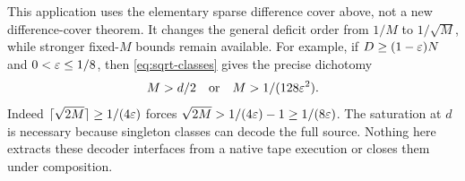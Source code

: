 This application uses the elementary sparse difference cover above, not a
new difference-cover theorem. It changes the general deficit order from
$1/M$ to $1/\sqrt M$, while stronger fixed-$M$ bounds remain available.
For example, if $D\ge(1-\varepsilon)N$ and $0<\varepsilon\le1/8$, then
\eqref{eq:sqrt-classes} gives the precise dichotomy
\[
 M>d/2\quad\text{or}\quad M>1/(128\varepsilon^2).
\]
Indeed $\lceil\sqrt{2M}\rceil\ge1/(4\varepsilon)$ forces
$\sqrt{2M}>1/(4\varepsilon)-1\ge1/(8\varepsilon)$.
The saturation at $d$ is necessary because singleton classes can decode
the full source. Nothing here extracts these decoder interfaces from a
native tape execution or closes them under composition.
